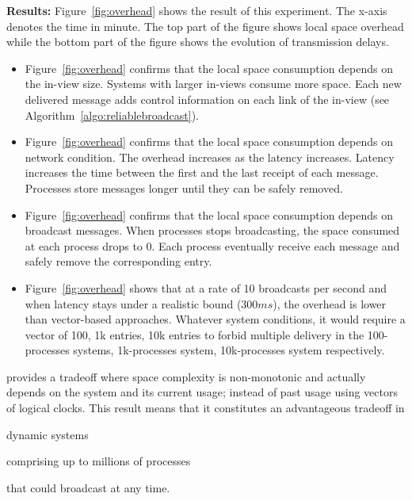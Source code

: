\noindent \textbf{Results:} Figure~\ref{fig:overhead} shows the result of this
experiment. The x-axis denotes the time in minute. The top part of the figure
shows local space overhead while the bottom part of the figure shows the
evolution of transmission delays. 

\begin{itemize}
\item Figure~\ref{fig:overhead} confirms that the local space consumption
  depends on the in-view size. Systems with larger in-views consume more
  space. Each new delivered message adds control information on each link of the
  in-view (see Algorithm~\ref{algo:reliablebroadcast}).
\item Figure~\ref{fig:overhead} confirms that the local space consumption
  depends on network condition. The overhead increases as the latency
  increases. Latency increases the time between the first and the last receipt
  of each message. Processes store messages longer until they can be safely
  removed. 
\item Figure~\ref{fig:overhead} confirms that the local space consumption
  depends on broadcast messages. When processes stops broadcasting, the space
  consumed at each process drops to 0. Each process eventually receive each
  message and safely remove the corresponding entry.
\item Figure~\ref{fig:overhead} shows that at a rate of 10 broadcasts per second
  and when latency stays under a realistic bound ($300ms$), the overhead is
  lower than vector-based approaches. Whatever system conditions, it would
  require a vector of 100, 1k entries, 10k entries to forbid multiple delivery
  in the 100-processes systems, 1k-processes system, 10k-processes system
  respectively.
\end{itemize}

\noindent \RPCBROADCAST provides a tradeoff where space complexity is
non-monotonic and actually depends on the system and its current usage; instead
of past usage using vectors of logical clocks. This result means that it
constitutes an advantageous tradeoff in
\begin{inparaenum}[(i)]
\item dynamic systems
\item comprising up to millions of processes
\item that could broadcast at any time.
\end{inparaenum} \\

